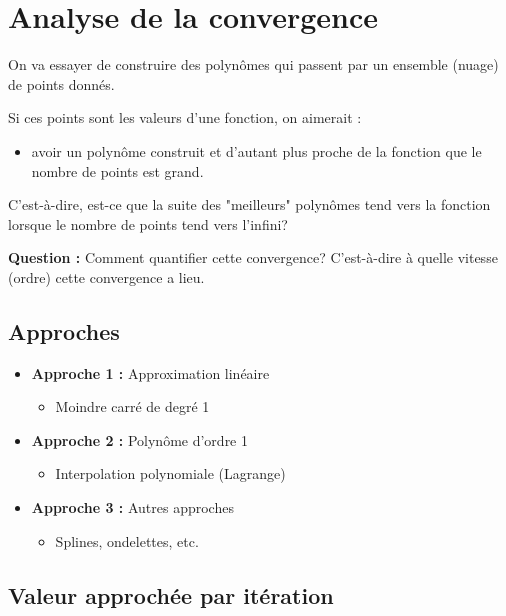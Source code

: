 \documentclass{article}
\begin{document}
\sloppy

\section{Analyse de la convergence}

On va essayer de construire des polynômes qui passent par un ensemble (nuage) de points donnés.

Si ces points sont les valeurs d'une fonction, on aimerait :
\begin{itemize}
    \item avoir un polynôme construit et d'autant plus proche de la fonction que le nombre de points est grand.
\end{itemize}

C'est-à-dire, est-ce que la suite des "meilleurs" polynômes tend vers la fonction lorsque le nombre de points tend vers l'infini?

\textbf{Question :} Comment quantifier cette convergence? C'est-à-dire à quelle vitesse (ordre) cette convergence a lieu.

\subsection{Approches}

\begin{itemize}
    \item \textbf{Approche 1 :} Approximation linéaire
    \begin{itemize}
        \item Moindre carré de degré 1
    \end{itemize}
    \item \textbf{Approche 2 :} Polynôme d'ordre 1
    \begin{itemize}
        \item Interpolation polynomiale (Lagrange)
    \end{itemize}
    \item \textbf{Approche 3 :} Autres approches
    \begin{itemize}
        \item Splines, ondelettes, etc.
    \end{itemize}
\end{itemize}


\subsection{Valeur approchée par itération}
\end{document}
